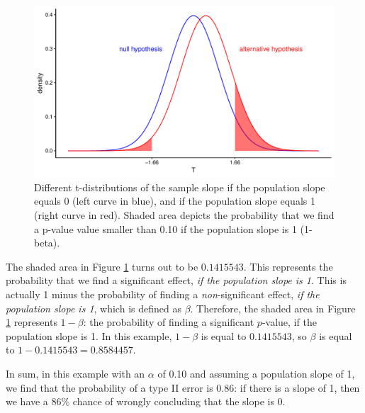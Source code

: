 \documentclass[]{book}\usepackage[]{graphicx}\usepackage[]{color}
\makeatletter
\def\maxwidth{ %
  \ifdim\Gin@nat@width>\linewidth
    \linewidth
  \else
    \Gin@nat@width
  \fi
}
\newenvironment{knitrout}{}{} %
\makeatother
\begin{document}
\begin{knitrout}
\color{fgcolor}\begin{figure}

{\centering \includegraphics[width=\maxwidth]{figure/inf_21-1} 

}

\caption[Different t-distributions of the sample slope if the population slope equals 0 (left curve in blue), and if the population slope equals 1 (right curve in red)]{Different t-distributions of the sample slope if the population slope equals 0 (left curve in blue), and if the population slope equals 1 (right curve in red). Shaded area depicts the probability that we find a p-value value smaller than 0.10 if the population slope is 1 (1-beta).}\label{fig:inf_21}
\end{figure}


\end{knitrout}

The shaded area in Figure \ref{fig:inf_21} turns out to be $0.1415543$. This represents the probability that we find a significant effect, \textit{if the population slope is 1}. This is actually 1 minus the probability of finding a \textit{non}-significant effect, \textit{if the population slope is 1}, which is defined as $\beta$. Therefore, the shaded area in Figure \ref{fig:inf_21} represents $1- \beta$: the probability of finding a significant $p$-value, if the population slope is 1. In this example, $1-\beta$ is equal to $0.1415543$, so $\beta$ is equal to $1- 0.1415543 = 0.8584457$.

In sum, in this example with an $\alpha$ of 0.10 and assuming a population slope of 1, we find that the probability of a type II error is 0.86: if there is a slope of 1, then we have a 86\% chance of wrongly concluding that the slope is 0.
\end{document}
